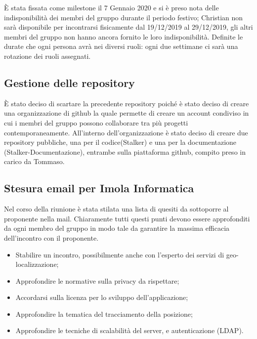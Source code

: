 È stata fissata come milestone il 7 Gennaio 2020 e si è preso nota delle indisponibilità dei membri del gruppo durante il periodo festivo; Christian non sarà disponibile per incontrarsi fisicamente dal 19/12/2019 al 29/12/2019, gli altri membri del gruppo non hanno ancora fornito le loro indisponibilità. 
Definite le durate che ogni persona avrà nei diversi ruoli: ogni due settimane ci sarà una rotazione dei ruoli assegnati. 

\subsection{Gestione delle repository}
È stato deciso di scartare la precedente repository poiché è stato deciso di creare una organizzazione di github la quale permette di creare un account condiviso in cui i membri del gruppo possono collaborare tra più progetti contemporaneamente.
All'interno dell'organizzazione è stato deciso di creare due repository pubbliche, una per il codice(Stalker) e una per la documentazione (Stalker-Documentazione), entrambe sulla piattaforma github, compito preso in carico da Tommaso. 

\subsection{Stesura email per Imola Informatica}
Nel corso della riunione è stata stilata una lista di quesiti da sottoporre al proponente nella mail. 
Chiaramente tutti questi punti devono essere approfonditi da ogni membro del gruppo in modo tale da garantire la massima efficacia dell'incontro con il proponente.
\begin{itemize}
\item Stabilire un incontro, possibilmente anche con l'esperto dei servizi di geo-localizzazione;
\item Approfondire le normative sulla privacy da rispettare;
\item Accordarsi sulla licenza per lo sviluppo dell'applicazione;
\item Approfondire la tematica del tracciamento della posizione;
\item Approfondire le tecniche di scalabilità del server, e autenticazione (LDAP).
\end{itemize} 

